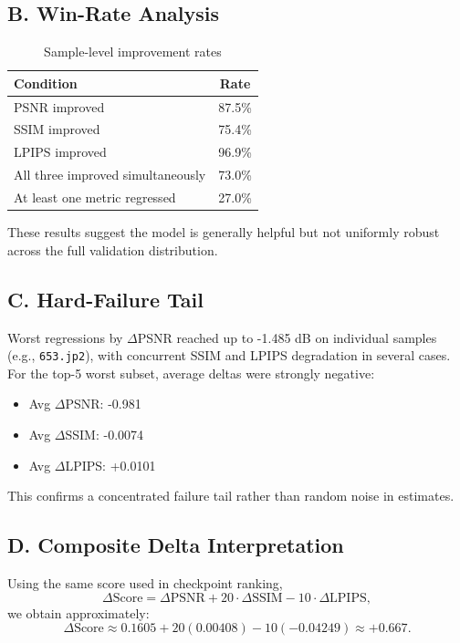 \documentclass[12pt]{article}
\begin{document}
\subsection*{B. Win-Rate Analysis}

\begin{table}[H]
\centering
\caption{Sample-level improvement rates}
\begin{tabular}{l c}
\toprule
Condition & Rate \\
\midrule
PSNR improved & 87.5\% \\
SSIM improved & 75.4\% \\
LPIPS improved & 96.9\% \\
All three improved simultaneously & 73.0\% \\
At least one metric regressed & 27.0\% \\
\bottomrule
\end{tabular}
\end{table}

These results suggest the model is generally helpful but not uniformly robust across the full validation distribution.

\subsection*{C. Hard-Failure Tail}

Worst regressions by $\Delta$PSNR reached up to -1.485 dB on individual samples (e.g., \texttt{653.jp2}), with concurrent SSIM and LPIPS degradation in several cases. For the top-5 worst subset, average deltas were strongly negative:
\begin{itemize}
    \item Avg $\Delta$PSNR: -0.981
    \item Avg $\Delta$SSIM: -0.0074
    \item Avg $\Delta$LPIPS: +0.0101
\end{itemize}

This confirms a concentrated failure tail rather than random noise in estimates.

\subsection*{D. Composite Delta Interpretation}

Using the same score used in checkpoint ranking,
\begin{equation}
\Delta\text{Score} = \Delta\text{PSNR} + 20\cdot\Delta\text{SSIM} - 10\cdot\Delta\text{LPIPS},
\end{equation}
we obtain approximately:
\begin{equation}
\Delta\text{Score} \approx 0.1605 + 20(0.00408) - 10(-0.04249) \approx +0.667.
\end{equation}
\end{document}
